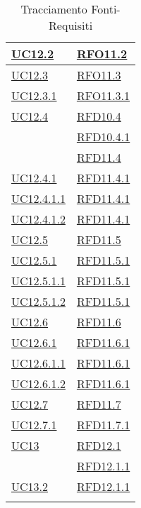 \begin{longtable}{|>{\centering}m{5cm}|m{5cm}<{\centering}|}
\hyperref[UC12.2]{UC12.2} & \hyperlink{RFO11.2}{RFO11.2}\\ \hline
\hyperref[UC12.3]{UC12.3} & \hyperlink{RFO11.3}{RFO11.3}\\ \hline
\hyperref[UC12.3.1]{UC12.3.1} & \hyperlink{RFO11.3.1}{RFO11.3.1}\\ \hline
\hyperref[UC12.4]{UC12.4} & \hyperlink{RFD10.4}{RFD10.4}\\
& \hyperlink{RFD10.4.1}{RFD10.4.1}\\
& \hyperlink{RFD11.4}{RFD11.4}\\ \hline
\hyperref[UC12.4.1]{UC12.4.1} & \hyperlink{RFD11.4.1}{RFD11.4.1}\\ \hline
\hyperref[UC12.4.1.1]{UC12.4.1.1} & \hyperlink{RFD11.4.1}{RFD11.4.1}\\ \hline
\hyperref[UC12.4.1.2]{UC12.4.1.2} & \hyperlink{RFD11.4.1}{RFD11.4.1}\\ \hline
\hyperref[UC12.5]{UC12.5} & \hyperlink{RFD11.5}{RFD11.5}\\ \hline
\hyperref[UC12.5.1]{UC12.5.1} & \hyperlink{RFD11.5.1}{RFD11.5.1}\\ \hline
\hyperref[UC12.5.1.1]{UC12.5.1.1} & \hyperlink{RFD11.5.1}{RFD11.5.1}\\ \hline
\hyperref[UC12.5.1.2]{UC12.5.1.2} & \hyperlink{RFD11.5.1}{RFD11.5.1}\\ \hline
\hyperref[UC12.6]{UC12.6} & \hyperlink{RFD11.6}{RFD11.6}\\ \hline
\hyperref[UC12.6.1]{UC12.6.1} & \hyperlink{RFD11.6.1}{RFD11.6.1}\\ \hline
\hyperref[UC12.6.1.1]{UC12.6.1.1} & \hyperlink{RFD11.6.1}{RFD11.6.1}\\ \hline
\hyperref[UC12.6.1.2]{UC12.6.1.2} & \hyperlink{RFD11.6.1}{RFD11.6.1}\\ \hline
\hyperref[UC12.7]{UC12.7} & \hyperlink{RFD11.7}{RFD11.7}\\ \hline
\hyperref[UC12.7.1]{UC12.7.1} & \hyperlink{RFD11.7.1}{RFD11.7.1}\\ \hline
\hyperref[UC13]{UC13} & \hyperlink{RFD12.1}{RFD12.1}\\
& \hyperlink{RFD12.1.1}{RFD12.1.1}\\ \hline
\hyperref[UC13.2]{UC13.2} & \hyperlink{RFD12.1.1}{RFD12.1.1}\\ \hline
\caption[Tracciamento Fonti-Requisiti]{Tracciamento Fonti-Requisiti}
\label{tabella:fonti-requi}
\end{longtable}
\clearpage
